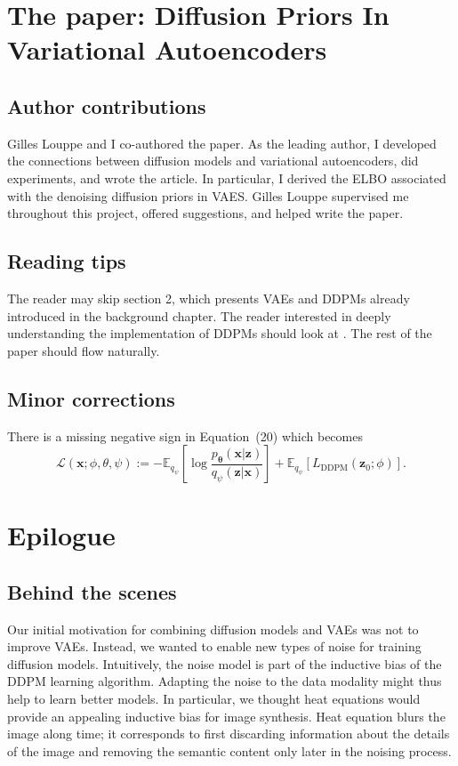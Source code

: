 \section{The paper: Diffusion Priors In Variational Autoencoders}

\subsection{Author contributions}
Gilles Louppe and I co-authored the paper. As the leading author, I developed the connections between diffusion models and variational autoencoders, did experiments, and wrote the article. In particular, I derived the ELBO associated with the denoising diffusion priors in VAES. Gilles Louppe supervised me throughout this project, offered suggestions, and helped write the paper.

\subsection{Reading tips}
The reader may skip section 2, which presents VAEs and DDPMs already introduced in the background chapter. The reader interested in deeply understanding the implementation of DDPMs should look at \citet{ho_denoising_2020}. The rest of the paper should flow naturally.

\subsection{Minor corrections}
There is a missing negative sign in Equation~(20) which becomes
$$\mathcal{L}(\mathbf{x}; \phi, \theta, \psi) := -\mathbb{E}_{q_{\psi}}\left[\log \frac{p_{\mathbf{\theta}}(\mathbf{x}|\mathbf{z})}{q_{\psi}(\mathbf{z}|\mathbf{x})} \right] + \mathbb{E}_{q_{\psi}}\left[ L_{\text{DDPM}}(\mathbf{z}_0; \phi)\right].$$



\section{Epilogue}
\subsection{Behind the scenes}

Our initial motivation for combining diffusion models and VAEs was not to improve VAEs. Instead, we wanted to enable new types of noise for training diffusion models. Intuitively, the noise model is part of the inductive bias of the DDPM learning algorithm. Adapting the noise to the data modality might thus help to learn better models. In particular, we thought heat equations would provide an appealing inductive bias for image synthesis. Heat equation blurs the image along time; it corresponds to first discarding information about the details of the image and removing the semantic content only later in the noising process.

